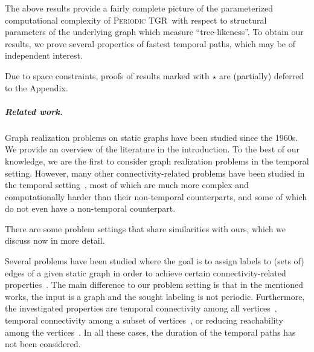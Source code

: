 \documentclass[a4paper,UKenglish,cleveref, autoref, thm-restate]{lipics-v2021}
\newcommand{\deltaExact}{\textsc{Periodic TGR}}
\begin{document}
The above results provide a fairly complete picture of the parameterized computational complexity of \deltaExact\ with respect to structural parameters of the underlying graph which measure ``tree-likeness''. To obtain our results, we prove several properties of fastest temporal paths, which may be of independent interest.

Due to space constraints, proofs of results marked with $\star$ are (partially) deferred to the Appendix.


\subparagraph{Related work.} Graph realization problems on static graphs have been studied since the 1960s. We provide an overview of the literature in the introduction. 
To the best of our knowledge, we are the first to consider graph realization problems in the temporal setting. However, many other connectivity-related problems have been studied in the temporal setting~\cite{Mertzios-transitivity21,Akrida-explorer-21,enright2021deleting,MolterRZ21,klobas2023interference,deligkas2022optimizing,erlebach2021temporal,Flu+19a,Zsc+19,CasteigtsCS22,FuchsleMNR22}, most of which are much more complex and computationally harder than their non-temporal counterparts, and some of which do not even have a non-temporal counterpart.

There are some problem settings that share similarities with ours, which we discuss now in more detail.

Several problems have been studied where the goal is to assign labels to (sets of) edges of a given static graph in order to achieve certain connectivity-related properties~\cite{KlobasMMS22,MertziosMS19,akrida2017complexity,enright2021assigning}. The main difference to our problem setting is that in the mentioned works, the input is a graph and the sought labeling is not periodic. Furthermore, the investigated properties are temporal connectivity among all vertices~\cite{KlobasMMS22,MertziosMS19,akrida2017complexity}, temporal connectivity among a subset of vertices~\cite{KlobasMMS22}, or reducing reachability among the vertices~\cite{enright2021assigning}. In all these cases, the duration of the temporal paths has not been considered.


\end{document}
